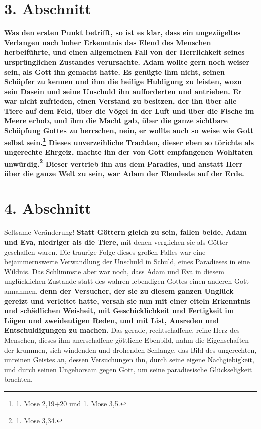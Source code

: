 \section{3. Abschnitt} \label{kap7_ab3}

\label{ref:07_03_wissen_erbsuende}
\textbf{Was den ersten Punkt betrifft, so ist es
klar, dass ein ungezügeltes Verlangen
nach hoher Erkenntnis
 das Elend des Menschen
herbeiführte, und einen allgemeinen
Fall von der Herrlichkeit seines ursprünglichen Zustandes verursachte.
 Adam
wollte gern noch weiser sein, als Gott ihn gemacht hatte. Es genügte ihm nicht,
seinen Schöpfer zu kennen und ihm die heilige Huldigung zu leisten, wozu sein
Dasein und seine Unschuld ihn aufforderten und antrieben. Er war nicht
zufrieden, einen Verstand zu besitzen, der ihn über alle
Tiere auf dem Feld,
über die Vögel in der Luft und über die Fische im Meere erhob, und ihm die Macht
gab, über die ganze sichtbare Schöpfung Gottes zu herrschen, nein, er wollte
auch so weise wie Gott selbst sein.\footnote{1. Mose 2,19+20 und 1. Mose 3,5.}
Dieses unverzeihliche Trachten, dieser eben so törichte als ungerechte
Ehrgeiz, machte
ihn der von Gott empfangenen Wohltaten unwürdig.\footnote{1. Mose 3,34.}
Dieser vertrieb ihn aus dem Paradies, und
anstatt Herr über die ganze Welt zu sein, war Adam der Elendeste auf der Erde.}

\section{4. Abschnitt} \label{kap7_ab4}

Seltsame Veränderung! \textbf{Statt Göttern gleich zu sein, fallen beide, Adam
und Eva,
niedriger als die Tiere,} mit denen verglichen sie als Götter geschaffen waren.
Die traurige Folge dieses großen Falles war eine bejammernswerte Verwandlung
der Unschuld in Schuld, eines Paradieses in eine Wildnis.
Das
Schlimmste aber
war noch, dass Adam und Eva in diesem unglücklichen Zustande statt des wahren
lebendigen Gottes einen anderen Gott annahmen, \textbf{denn der
Versucher, der sie zu
diesem ganzen Unglück gereizt und verleitet hatte, versah sie nun mit einer
eiteln Erkenntnis und schädlichen
Weisheit, mit Geschicklichkeit und
Fertigkeit
im Lügen und zweideutigen Reden, und mit
List, Ausreden und Entschuldigungen zu
machen.} Das gerade, rechtschaffene, reine Herz des Menschen, dieses ihm
anerschaffene göttliche Ebenbild, nahm die Eigenschaften der krummen, sich
windenden und drohenden Schlange, das Bild des
ungerechten, unreinen Geistes an,
dessen Versuchungen ihn, durch seine eigene Nachgiebigkeit, und durch seinen
Ungehorsam gegen Gott, um seine paradiesische
Glückseligkeit brachten.


